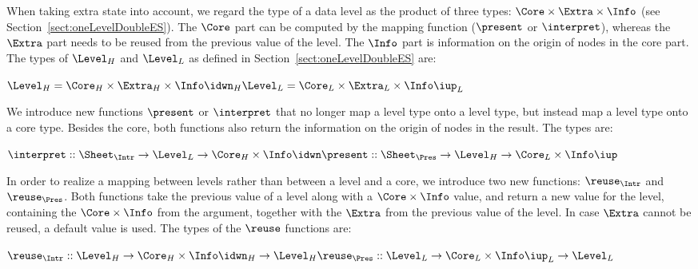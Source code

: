 When taking extra state into account, we regard the type of a data level as the product of three types: 
$\Core \times \Extra \times \Info$ (see Section~\ref{sect:oneLevelDoubleES}). The $\Core$ part can be computed by the mapping function ($\present$ or $\interpret$), whereas the $\Extra$ part needs to be reused from the previous value of the level. The $\Info$ part is information on the origin of nodes in the core part. The types of $\Level_{H}$ and $\Level_{L}$ as defined in Section~\ref{sect:oneLevelDoubleES} are: 

\begin{small}\begin{math} 
\Level_{H} = \Core_{H} \times \Extra_{H} \times \Info\idwn_{H}\\
\Level_{L} = \Core_{L} \times \Extra_{L} \times \Info\iup_{L}\\
\end{math}\end{small}

We introduce new functions $\present$ or $\interpret$ that no longer map a level type onto a level type, but instead map a level type onto a core type. Besides the core, both functions also return the information on the origin of nodes in the result. The types are:

\begin{small}\begin{math}
\interpret :: \Sheet_{\Intr} \rightarrow \Level_{L} \rightarrow \Core_{H}\times \Info\idwn\\
\present :: \Sheet_{\Pres} \rightarrow  \Level_{H} \rightarrow \Core_{L}\times \Info\iup\\
\end{math}\end{small}

In order to realize a mapping between levels rather than between a level and a core, we introduce two new functions: $\reuse_{\Intr}$  and $\reuse_{\Pres}$. Both functions take the previous value of a level along with a $\Core \times \Info$ value, and return a new value for the level, containing the $\Core \times \Info$ from the argument, together with the $\Extra$ from the previous value of the level. In case $\Extra$  cannot be reused, a default value is used. The types of the $\reuse$ functions are:

\begin{small}\begin{math}
\reuse_{\Intr} ::  \Level_{H} \rightarrow \Core_{H} \times \Info\idwn_{H} \rightarrow \Level_{H}\\
\reuse_{\Pres} ::  \Level_{L}  \rightarrow \Core_{L} \times \Info\iup_{L}    \rightarrow \Level_{L}\\
\end{math}\end{small} 

